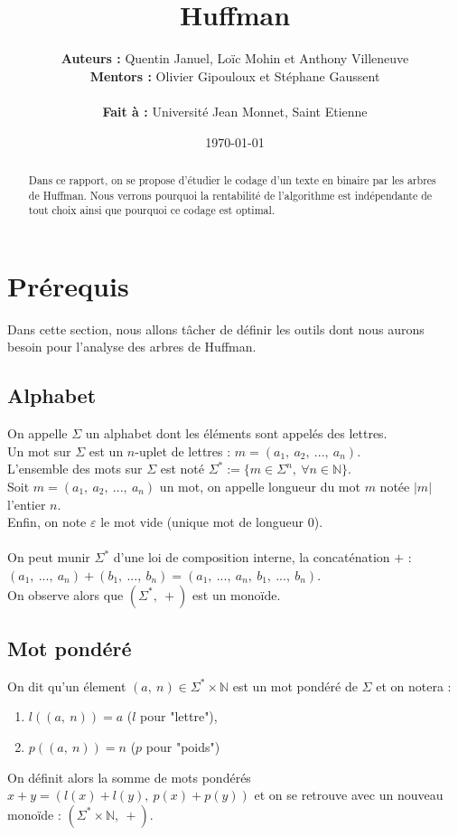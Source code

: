 \documentclass[a4paper, 12pt]{article}
\title{Huffman}
\author{
\textbf{Auteurs :} Quentin Januel, Loïc Mohin et Anthony Villeneuve \\
\textbf{Mentors :} Olivier Gipouloux et Stéphane Gaussent \\ \\
\textbf{Fait à :} Université Jean Monnet, Saint Etienne
}
\date{\today}
\begin{document}
\maketitle
\begin{abstract}
Dans ce rapport, on se propose d'étudier le codage d'un texte en binaire par les arbres de Huffman. Nous verrons pourquoi la rentabilité de l'algorithme est indépendante de tout choix ainsi que pourquoi ce codage est optimal.
\end{abstract}
\newpage
\tableofcontents{}
\newpage

\section{Prérequis}

Dans cette section, nous allons tâcher de définir les outils dont nous aurons besoin pour l'analyse des arbres de Huffman.

\subsection{Alphabet}
On appelle $\Sigma$ un alphabet dont les éléments sont appelés des lettres. \\
Un mot sur $\Sigma$ est un $n$-uplet de lettres : $m = (a_1,\ a_2,\ ...,\ a_n)$. \\
L'ensemble des mots sur $\Sigma$ est noté $\Sigma^* := \{m \in \Sigma^n,\ \forall n \in \mathbb{N}\}$. \\
Soit $m = (a_1,\ a_2,\ ...,\ a_n)$ un mot, on appelle longueur du mot $m$ notée $|m|$ l'entier $n$. \\
Enfin, on note $\varepsilon$ le mot vide (unique mot de longueur $0$). \\ \\
On peut munir $\Sigma^*$ d'une loi de composition interne, la concaténation $+$ : \\
$(a_1,\ ...,\ a_n)+(b_1,\ ...,\ b_n) = (a_1,\ ...,\ a_n,\ b_1,\ ...,\ b_n)$. \\
On observe alors que $(\Sigma^*,\ +)$ est un monoïde.

\subsection{Mot pondéré}
On dit qu'un élement $(a,\ n)\in \Sigma^*\times \mathbb{N}$ est un mot pondéré de $\Sigma$ et on notera :
\begin{enumerate}
\item $l((a,\ n)) = a$ ($l$ pour "lettre"),
\item $p((a,\ n)) = n$ ($p$ pour "poids")
\end{enumerate}
On définit alors la somme de mots pondérés $x+y = (l(x)+l(y),\ p(x)+p(y))$ et on se retrouve avec un nouveau monoïde :  $(\Sigma^*\times \mathbb{N},\ +)$.
\end{document}
